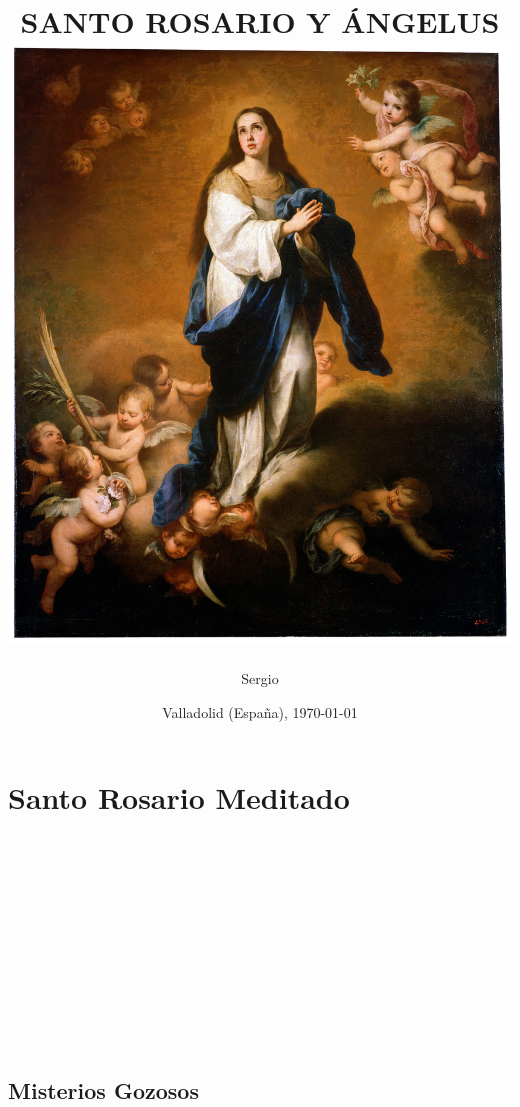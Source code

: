 \documentclass[10pt,a4paper,oneside]{book}
\title{
    {\Huge \uppercase{Santo Rosario y Ángelus}}\\
    {\includegraphics{foto-04.jpg}}\\
}
\author{Sergio}
\date{Valladolid (España), \monthyeardate\today}
\newcommand\blankpage{%
    \null
    \thispagestyle{empty}%
    \addtocounter{page}{-1}%
    \newpage
}
\newcounter{joyful-counter}
\begin{document}
\maketitle
\afterpage{\blankpage}

\chapter*{Santo Rosario Meditado}

\begin{minipage}[t]{0.475\textwidth}
      
      \vspace{1mm}
      \\[2mm]
      \\[1mm]
      \\[1mm]
      \\[1mm]
      \\
\end{minipage}
\begin{minipage}[t]{0.475\textwidth}
      
      \vspace{1mm}
      \\[2mm]
      \\[1mm]
      \\[1mm]
      \\[1mm]
      \\
\end{minipage}

\medskip

\begin{center}
\end{center}

\section*{Misterios Gozosos}
\textorojo{}
\end{document}
